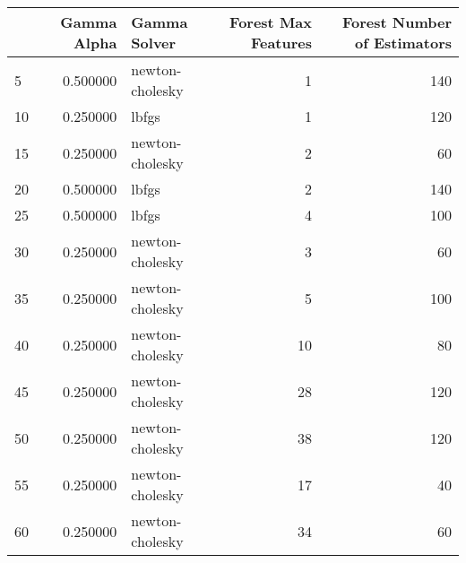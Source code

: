 \begin{tabular}{lrlrr}
\toprule
 & Gamma Alpha & Gamma Solver & Forest Max Features & Forest Number of Estimators \\
\midrule
5 & 0.500000 & newton-cholesky & 1 & 140 \\
10 & 0.250000 & lbfgs & 1 & 120 \\
15 & 0.250000 & newton-cholesky & 2 & 60 \\
20 & 0.500000 & lbfgs & 2 & 140 \\
25 & 0.500000 & lbfgs & 4 & 100 \\
30 & 0.250000 & newton-cholesky & 3 & 60 \\
35 & 0.250000 & newton-cholesky & 5 & 100 \\
40 & 0.250000 & newton-cholesky & 10 & 80 \\
45 & 0.250000 & newton-cholesky & 28 & 120 \\
50 & 0.250000 & newton-cholesky & 38 & 120 \\
55 & 0.250000 & newton-cholesky & 17 & 40 \\
60 & 0.250000 & newton-cholesky & 34 & 60 \\
\bottomrule
\end{tabular}
